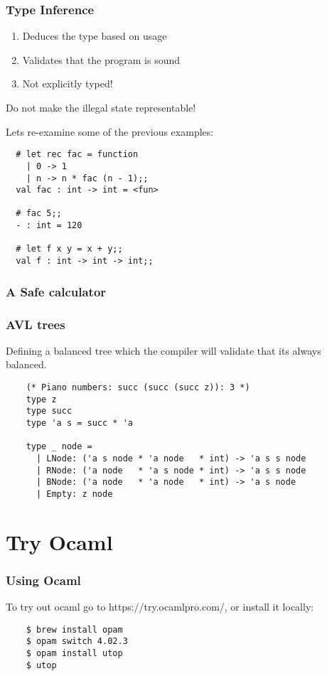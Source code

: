\documentclass[mathserif,xcolor=svgnames]{beamer}
\renewcommand{\_}{\mathunderscore}
\begin{document}
\begin{frame}[fragile]
  \frametitle{Type Inference}
  \begin{enumerate}
  \item Deduces the type based on usage
  \item Validates that the program is sound
  \item Not explicitly typed!
  \end{enumerate}

  Do not make the illegal state representable!
\end{frame}

\begin{frame}[fragile]
  Lets re-examine some of the previous examples:
  \begin{lstlisting}
  # let rec fac = function
    | 0 -> 1
    | n -> n * fac (n - 1);;
  val fac : int -> int = <fun>

  # fac 5;;
  - : int = 120

  # let f x y = x + y;;
  val f : int -> int -> int;;
  \end{lstlisting}

\end{frame}

\begin{frame}[fragile]
  \frametitle{A Safe calculator}
  
\end{frame}

\begin{frame}[fragile]
  \frametitle{AVL trees}
  Defining a balanced tree which the compiler will validate that its
  always balanced.

  \begin{lstlisting}
    (* Piano numbers: succ (succ (succ z)): 3 *)
    type z
    type succ
    type 'a s = succ * 'a

    type _ node =
      | LNode: ('a s node * 'a node   * int) -> 'a s s node
      | RNode: ('a node   * 'a s node * int) -> 'a s s node
      | BNode: ('a node   * 'a node   * int) -> 'a s node
      | Empty: z node
  \end{lstlisting}

\end{frame}

\section{Try Ocaml}
\begin{frame}[fragile]
  \frametitle{Using Ocaml}
  To try out ocaml go to https://try.ocamlpro.com/, or install it locally:
  \begin{lstlisting}
    $ brew install opam
    $ opam switch 4.02.3
    $ opam install utop
    $ utop
  \end{lstlisting}
\end{frame}
\end{document}
